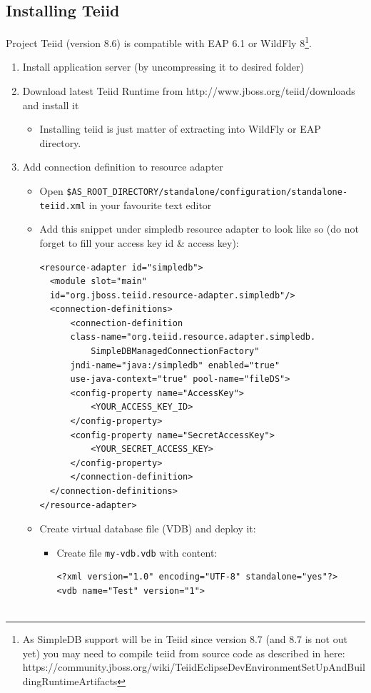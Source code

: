 \documentclass[oneside,12pt]{fithesis2}
\begin{document}
\subsection*{Installing Teiid}
Project Teiid (version 8.6) is compatible with EAP 6.1 or WildFly 8\footnote{As SimpleDB support will be in Teiid since version 8.7 (and 8.7 is not out yet) you may need to compile teiid from source code as described in here: https://community.jboss.org/wiki/TeiidEclipseDevEnvironmentSetUpAndBuildingRuntimeArtifacts}.

\begin{enumerate}
 \item Install application server (by uncompressing it to desired folder)
 \item Download latest Teiid Runtime from http://www.jboss.org/teiid/downloads and install it
 \begin{itemize}
  \item Installing teiid is just matter of extracting into WildFly or EAP directory.
 \end{itemize}
 \item Add connection definition to resource adapter
 \begin{itemize}
  \item Open \texttt{\$AS\_ROOT\_DIRECTORY/standalone/configuration/\allowbreak standalone-teiid.xml} in your favourite text editor
  \item Add this snippet under simpledb resource adapter to look like so (do not forget to fill your access key id \& access key):
  \begin{Verbatim}[fontsize=\small]
<resource-adapter id="simpledb">
  <module slot="main" 
  id="org.jboss.teiid.resource-adapter.simpledb"/>
  <connection-definitions>
      <connection-definition 
      class-name="org.teiid.resource.adapter.simpledb.
		  SimpleDBManagedConnectionFactory" 
      jndi-name="java:/simpledb" enabled="true" 
      use-java-context="true" pool-name="fileDS">
	  <config-property name="AccessKey">
	      <YOUR_ACCESS_KEY_ID>
	  </config-property>
	  <config-property name="SecretAccessKey">
	      <YOUR_SECRET_ACCESS_KEY>
	  </config-property>
      </connection-definition>
  </connection-definitions>
</resource-adapter>
  \end{Verbatim}
 \item Create virtual database file (VDB) and deploy it:
 \begin{itemize}
  \item Create file \texttt{my-vdb.vdb} with content:
  \begin{Verbatim}[fontsize=\small]
<?xml version="1.0" encoding="UTF-8" standalone="yes"?>
<vdb name="Test" version="1">


\end{Verbatim}
\end{itemize}
\end{itemize}
\end{enumerate}
\end{document}
